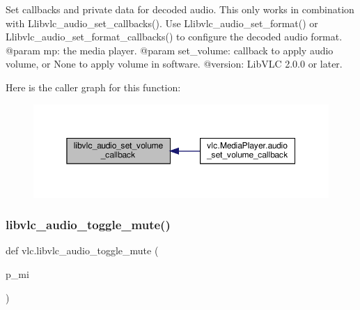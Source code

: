 \begin{DoxyVerb}Set callbacks and private data for decoded audio. This only works in
combination with L{libvlc_audio_set_callbacks}().
Use L{libvlc_audio_set_format}() or L{libvlc_audio_set_format_callbacks}()
to configure the decoded audio format.
@param mp: the media player.
@param set_volume: callback to apply audio volume, or None to apply volume in software.
@version: LibVLC 2.0.0 or later.
\end{DoxyVerb}
 Here is the caller graph for this function\+:
\nopagebreak
\begin{figure}[H]
\begin{center}
\leavevmode
\includegraphics[width=350pt]{namespacevlc_a304ceaa4a56a980bf12623e54edd3444_icgraph}
\end{center}
\end{figure}
\mbox{\label{namespacevlc_ad72cfaafb813c822567cc1a8fcfc8429}} 
\subsubsection{\texorpdfstring{libvlc\+\_\+audio\+\_\+toggle\+\_\+mute()}{libvlc\_audio\_toggle\_mute()}}
{\footnotesize\ttfamily def vlc.\+libvlc\+\_\+audio\+\_\+toggle\+\_\+mute (\begin{DoxyParamCaption}\item[{}]{p\+\_\+mi }\end{DoxyParamCaption})}

